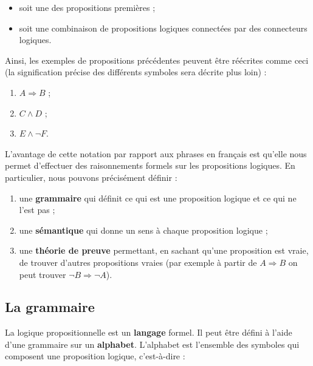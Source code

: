 \begin{itemize}
\item soit une des propositions premières ;
\item soit une combinaison de propositions logiques connectées par des
  connecteurs logiques.
\end{itemize}

Ainsi, les exemples de propositions précédentes peuvent être réécrites
comme ceci (la signification précise des différents symboles sera décrite
plus loin) :

\begin{enumerate}
\item $A \Rightarrow B$ ;
\item $C \land D$ ;
\item $E \land \lnot F$.
\end{enumerate}


L’avantage de cette notation par rapport aux phrases en français est qu’elle
nous permet d’effectuer des raisonnements formels sur les propositions
logiques. En particulier, nous pouvons précisément définir :

\begin{enumerate}
\item une \textbf{grammaire} qui définit ce qui est une proposition logique et ce qui
  ne l’est pas ;
\item une \textbf{sémantique} qui donne un sens à chaque proposition logique ;
\item une \textbf{théorie de preuve} permettant, en sachant qu’une proposition est
  vraie, de trouver d’autres propositions vraies (par exemple à partir de $A
  \Rightarrow B$ on peut trouver $\lnot B \Rightarrow \lnot A$).
\end{enumerate}
\subsection{La grammaire}

La logique propositionnelle est un \textbf{langage} formel. Il peut être défini
à l’aide d’une grammaire sur un \textbf{alphabet}. L’alphabet est l’ensemble des
symboles qui composent une proposition logique, c’est-à-dire :

